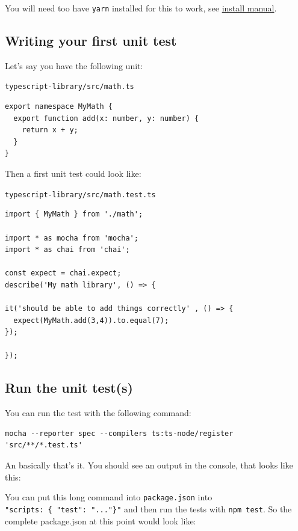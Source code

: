 \documentclass[12pt,a4paper]{article}
\newcommand{\filelabel}[1]{{\footnotesize\color{dkgreen}\texttt{#1}}{\vspace{-0.2cm}}}
\begin{document}
You will need too have \texttt{yarn} installed for this to work, see
\href{https://yarnpkg.com/lang/en/docs/install}{install manual}.

\subsection{\texorpdfstring{ Writing your first unit
test}{Writing your first unit test}}\label{step-2-writing-your-first-unit-test}

Let's say you have the following unit:

\filelabel{typescript-library/src/math.ts}

\begin{lstlisting}
export namespace MyMath {
  export function add(x: number, y: number) {
    return x + y;
  }
}
\end{lstlisting}

Then a first unit test could look like:

\filelabel{typescript-library/src/math.test.ts}

\begin{lstlisting}
import { MyMath } from './math';

import * as mocha from 'mocha';
import * as chai from 'chai';

const expect = chai.expect;
describe('My math library', () => {

it('should be able to add things correctly' , () => {
  expect(MyMath.add(3,4)).to.equal(7);
});

});
\end{lstlisting}

\subsection{\texorpdfstring{ Run the unit
test(s)}{Run the unit test(s)}}\label{step-3-run-the-unit-tests}

You can run the test with the following command:

\begin{lstlisting}
mocha --reporter spec --compilers ts:ts-node/register 'src/**/*.test.ts'
\end{lstlisting}

An basically that's it. You should see an output in the console, that
looks like this:

You can put this long command into \texttt{package.json} into
\texttt{"scripts:\ \{\ "test":\ "..."\}"} and then run the tests with
\texttt{npm\ test}. So the complete package.json at this point would
look like:
\end{document}

